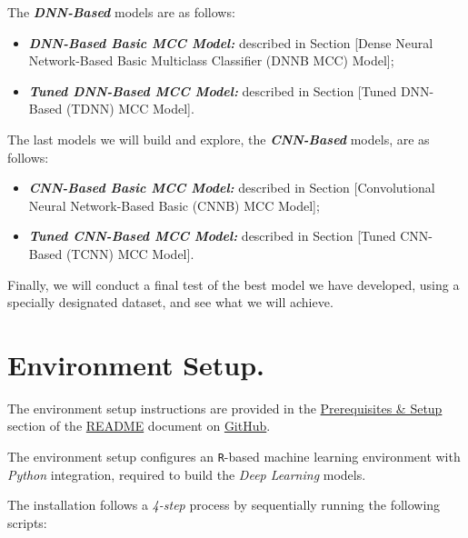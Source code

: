\documentclass[
]{report}
\providecommand{\tightlist}{%
  \setlength{\itemsep}{0pt}\setlength{\parskip}{0pt}}
\begin{document}
The \textbf{\emph{DNN-Based}} models are as follows:

\begin{itemize}
\tightlist
\item
  \textbf{\emph{DNN-Based Basic MCC Model:}} described in Section {[}Dense Neural Network-Based Basic Multiclass Classifier (DNNB MCC) Model{]};
\item
  \textbf{\emph{Tuned DNN-Based MCC Model:}} described in Section {[}Tuned DNN-Based (TDNN) MCC Model{]}.
\end{itemize}

The last models we will build and explore, the \textbf{\emph{CNN-Based}} models, are as follows:

\begin{itemize}
\tightlist
\item
  \textbf{\emph{CNN-Based Basic MCC Model:}} described in Section {[}Convolutional Neural Network-Based Basic (CNNB) MCC Model{]};
\item
  \textbf{\emph{Tuned CNN-Based MCC Model:}} described in Section {[}Tuned CNN-Based (TCNN) MCC Model{]}.
\end{itemize}

Finally, we will conduct a final test of the best model we have developed, using a specially designated dataset, and see what we will achieve.

\newpage

\section{Environment Setup.}\label{environment-setup.}

\begin{noteblock}
The environment setup instructions are provided in the \href{https://github.com/AzKurban-edX-DS/edx.capstone.choose-your-own/blob/dev/README.md\#prerequisites--setup}{Prerequisites \& Setup} section of the \href{https://github.com/AzKurban-edX-DS/edx.capstone.choose-your-own/blob/dev/README.md}{README} document on \href{https://github.com/AzKurban-edX-DS/edx.capstone.choose-your-own}{GitHub}.

\end{noteblock}

The environment setup configures an \texttt{R}-based machine learning environment with \emph{Python} integration, required to build the \emph{Deep Learning} models.

The installation follows a \emph{4-step} process by sequentially running the following scripts:
\end{document}

